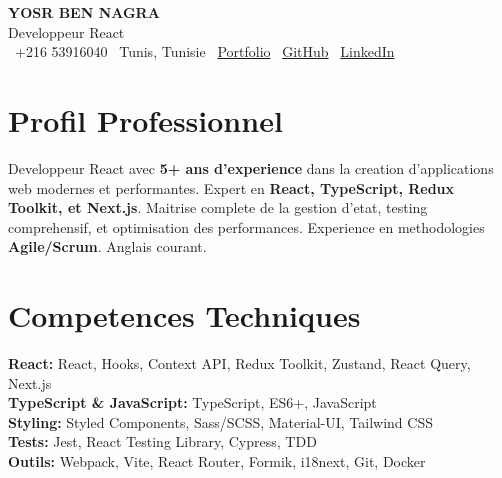 \documentclass[10pt,a4paper]{article}
\begin{document}
\begin{center}
  {\Large\bfseries\color{primary} YOSR BEN NAGRA}\\[2pt]
  {\small\color{darkgray} Developpeur React}\\[3pt]
  {\footnotesize
    \faPhone\ +216 53916040 \quad
    \faMapMarker*\ Tunis, Tunisie \quad
    \faGlobe\ \href{https://portfolio-yosr.vercel.app/en}{Portfolio} \quad
    \faGithub\ \href{https://github.com/YosrBennagra}{GitHub} \quad
    \faLinkedin\ \href{https://www.linkedin.com/in/yosr-ben-nagra/}{LinkedIn}
  }
\end{center}

\section*{Profil Professionnel}
{\small
Developpeur React avec \textbf{5+ ans d'experience} dans la creation d'applications web modernes et performantes. Expert en \textbf{React, TypeScript, Redux Toolkit, et Next.js}. Maitrise complete de la gestion d'etat, testing comprehensif, et optimisation des performances. Experience en methodologies \textbf{Agile/Scrum}. Anglais courant.
}

\vspace{6pt}

\section*{Competences Techniques}
{\small
\textbf{React:} React, Hooks, Context API, Redux Toolkit, Zustand, React Query, Next.js\\[2pt]
\textbf{TypeScript \& JavaScript:} TypeScript, ES6+, JavaScript\\[2pt]
\textbf{Styling:} Styled Components, Sass/SCSS, Material-UI, Tailwind CSS\\[2pt]
\textbf{Tests:} Jest, React Testing Library, Cypress, TDD\\[2pt]
\textbf{Outils:} Webpack, Vite, React Router, Formik, i18next, Git, Docker
}

\vspace{6pt}

\end{document}
